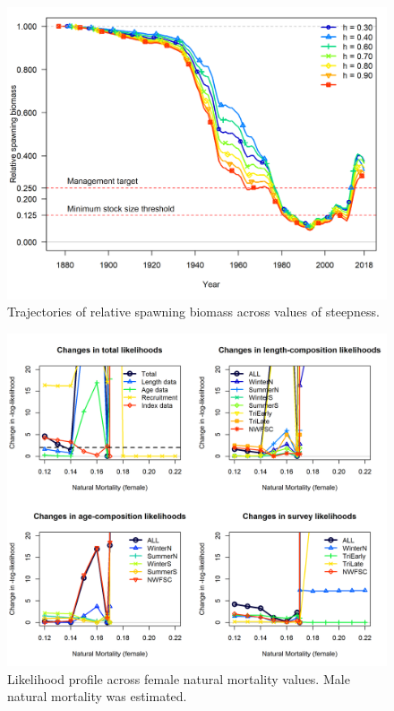 \documentclass[12pt,]{article}
\begin{document}
\FloatBarrier

\begin{figure}
\centering
\includegraphics{Figures/h_trajectories.png}
\caption{Trajectories of relative spawning biomass across values of
steepness. \label{fig:h_trajectory}}
\end{figure}

\FloatBarrier

\begin{figure}
\centering
\includegraphics{Figures/piner_panel_m.png}
\caption{Likelihood profile across female natural mortality values. Male
natural mortality was estimated. \label{fig:m_like}}
\end{figure}
\end{document}

